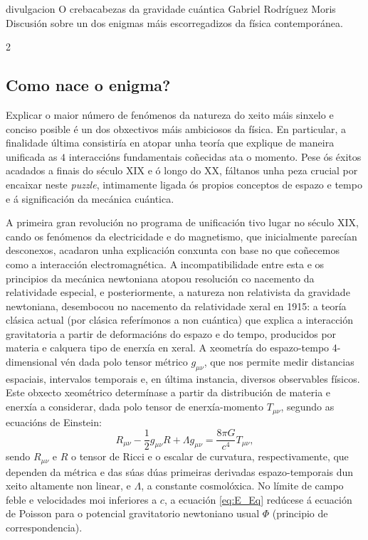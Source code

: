 \Artigo%
{divulgacion}%
{O crebacabezas da gravidade cuántica}%
{Gabriel Rodríguez Moris}%
{Discusión sobre un dos enigmas máis escorregadizos da física contemporánea.}

\begin{multicols}{2}

\subsection*{Como nace o enigma?}

Explicar o maior número de fenómenos da natureza do xeito máis sinxelo e
conciso posible é un dos obxectivos máis ambiciosos da física. En particular, a
finalidade última consistiría en atopar unha teoría que explique de maneira
unificada as $4$ interaccións fundamentais coñecidas ata o momento. Pese ós
éxitos acadados a finais do século XIX e ó longo do XX, fáltanos unha peza
crucial por encaixar neste \textit{puzzle}, intimamente ligada ós propios
conceptos de espazo e tempo e á significación da mecánica cuántica.

A primeira gran revolución no programa de unificación tivo lugar no século
XIX, cando os fenómenos da electricidade e do magnetismo, que inicialmente
parecían desconexos, acadaron unha explicación conxunta con base no que
coñecemos como a interacción electromagnética. A incompatibilidade entre esta e
os principios da mecánica newtoniana atopou resolución co nacemento da
relatividade especial, e posteriormente, a natureza non relativista da
gravidade newtoniana, desembocou no nacemento da relatividade xeral en 1915: a
teoría clásica actual (por clásica referímonos a non cuántica) que explica a
interacción gravitatoria a partir de deformacións do espazo e do tempo,
producidos por materia e calquera tipo de enerxía en xeral. A xeometría do
espazo-tempo 4-dimensional vén dada polo tensor métrico $g_{\mu \nu}$, que nos
permite medir distancias espaciais, intervalos temporais e, en última instancia,
diversos observables físicos. Este obxecto xeométrico determínase a partir da
distribución de materia e enerxía a considerar, dada polo tensor de
enerxía-momento $T_{\mu \nu}$, segundo as ecuacións de Einstein:
%
\begin{equation}
    R_{\mu \nu} - \frac{1}{2} g_{\mu \nu} R + \Lambda g_{\mu \nu} =
    \frac{8 \pi G}{c^4} T_{\mu \nu},
    \label{eq:E_Eq}
\end{equation}
%
sendo $R_{\mu \nu}$ e $R$ o tensor de Ricci e o escalar de curvatura,
respectivamente, que dependen da métrica e das súas dúas primeiras derivadas
espazo-temporais dun xeito altamente non linear, e $\Lambda$, a constante %
cosmolóxica. No límite de campo feble e velocidades moi inferiores a $c$, a
ecuación \eqref{eq:E_Eq} redúcese á ecuación de Poisson para o potencial
gravitatorio newtoniano usual $\Phi$ (principio de correspondencia).


\end{multicols}
